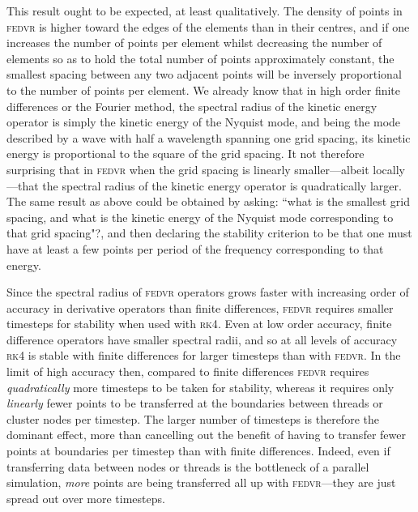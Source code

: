 This result ought to be expected, at least qualitatively. The density of points in \textsc{fedvr} is higher toward the edges of the elements than in their centres, and if one increases the number of points per element whilst decreasing the number of elements so as to hold the total number of points approximately constant, the smallest spacing between any two adjacent points will be inversely proportional to the number of points per element. We already know that in high order finite differences or the Fourier method, the spectral radius of the kinetic energy operator is simply the kinetic energy of the Nyquist mode, and being the mode described by a wave with half a wavelength spanning one grid spacing, its kinetic energy is proportional to the square of the grid spacing. It not therefore surprising that in \textsc{fedvr} when the grid spacing is linearly smaller---albeit locally---that the spectral radius of the kinetic energy operator is quadratically larger. The same result as above could be obtained by asking: ``what is the smallest grid spacing, and what is the kinetic energy of the Nyquist mode corresponding to that grid spacing"?, and then declaring the stability criterion to be that one must have at least a few points per period of the frequency corresponding to that energy.

Since the spectral radius of \textsc{fedvr} operators grows faster with increasing order of accuracy in derivative operators than finite differences, \textsc{fedvr} requires smaller timesteps for stability when used with \textsc{rk4}. Even at low order accuracy, finite difference operators have smaller spectral radii, and so at all levels of accuracy \textsc{rk4} is stable with finite differences for larger timesteps than with \textsc{fedvr}. In the limit of high accuracy then, compared to finite differences \textsc{fedvr} requires \emph{quadratically} more timesteps to be taken for stability, whereas it requires only \emph{linearly} fewer points to be transferred at the boundaries between threads or cluster nodes per timestep. The larger number of timesteps is therefore the dominant effect, more than cancelling out the benefit of having to transfer fewer points at boundaries per timestep than with finite differences. Indeed, even if transferring data between nodes or threads is the bottleneck of a parallel simulation, \emph{more} points are being transferred all up with \textsc{fedvr}---they are just spread out over more timesteps.

